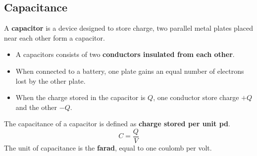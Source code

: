 \subsection{Capacitance}

A \textbf{capacitor} is a device designed to store charge, two parallel metal plates placed near each other form a capacitor.
\begin{itemize}
    \item A capacitors consists of two \textbf{conductors insulated from each other}.
    \item When connected to a battery, one plate gains an equal number of electrons lost by the other plate.
    \item When the charge stored in the capacitor is $Q$, one conductor store charge $+Q$ and the other $-Q$.
\end{itemize}

The capacitance of a capacitor is defined as \textbf{charge stored per unit pd}.
$$C=\frac{Q}{V}$$
The unit of capacitance is the \textbf{farad}, equal to one coulomb per volt.

